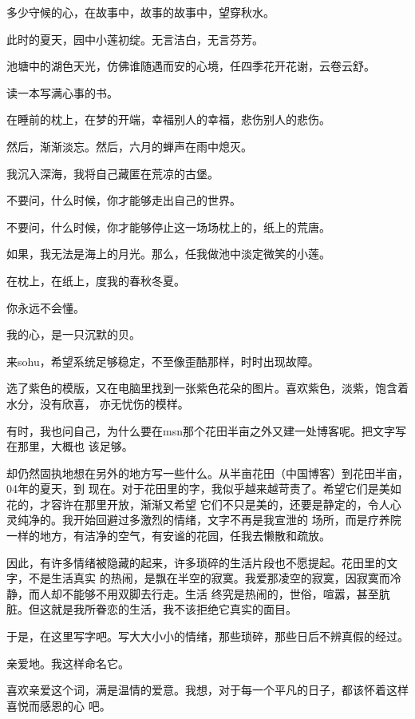 		多少守候的心，在故事中，故事的故事中，望穿秋水。\par
		此时的夏天，园中小莲初绽。无言洁白，无言芬芳。\par
		池塘中的湖色天光，仿佛谁随遇而安的心境，任四季花开花谢，云卷云舒。\par
		读一本写满心事的书。\par
		在睡前的枕上，在梦的开端，幸福别人的幸福，悲伤别人的悲伤。\par
		然后，渐渐淡忘。然后，六月的蝉声在雨中熄灭。\par
		我沉入深海，我将自己藏匿在荒凉的古堡。\par
		不要问，什么时候，你才能够走出自己的世界。\par
		不要问，什么时候，你才能够停止这一场场枕上的，纸上的荒唐。\par
		如果，我无法是海上的月光。那么，任我做池中淡定微笑的小莲。\par
		在枕上，在纸上，度我的春秋冬夏。

		你永远不会懂。\par
		我的心，是一只沉默的贝。

	\endwriting



		来sohu，希望系统足够稳定，不至像歪酷那样，时时出现故障。

		选了紫色的模版，又在电脑里找到一张紫色花朵的图片。喜欢紫色，淡紫，饱含着水分，没有欣喜，
	亦无忧伤的模样。

		有时，我也问自己，为什么要在msn那个花田半亩之外又建一处博客呢。把文字写在那里，大概也
	该足够。

		却仍然固执地想在另外的地方写一些什么。从半亩花田（中国博客）到花田半亩，04年的夏天，到
	现在。对于花田里的字，我似乎越来越苛责了。希望它们是美如花的，才容许在那里开放，渐渐又希望
	它们不只是美的，还要是静定的，令人心灵纯净的。我开始回避过多激烈的情绪，文字不再是我宣泄的
	场所，而是疗养院一样的地方，有洁净的空气，有安谧的花园，任我去懒散和疏放。

		因此，有许多情绪被隐藏的起来，许多琐碎的生活片段也不愿提起。花田里的文字，不是生活真实
	的热闹，是飘在半空的寂寞。我爱那凌空的寂寞，因寂寞而冷静，而人却不能够不用双脚去行走。生活
	终究是热闹的，世俗，喧嚣，甚至肮脏。但这就是我所眷恋的生活，我不该拒绝它真实的面目。

		于是，在这里写字吧。写大大小小的情绪，那些琐碎，那些日后不辨真假的经过。

		亲爱地。我这样命名它。

		喜欢亲爱这个词，满是温情的爱意。我想，对于每一个平凡的日子，都该怀着这样喜悦而感恩的心
	吧。

